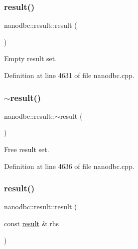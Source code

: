 \subsubsection{\texorpdfstring{result()}{result()}\hspace{0.1cm}{\footnotesize\ttfamily [1/3]}}
{\footnotesize\ttfamily nanodbc\+::result\+::result (\begin{DoxyParamCaption}{ }\end{DoxyParamCaption})}



Empty result set. 



Definition at line 4631 of file nanodbc.\+cpp.

\mbox{\label{classnanodbc_1_1result_a19f6d7665824d9b06d7c2db22b34b4f3}} 
\subsubsection{\texorpdfstring{$\sim$result()}{~result()}}
{\footnotesize\ttfamily nanodbc\+::result\+::$\sim$result (\begin{DoxyParamCaption}{ }\end{DoxyParamCaption})\hspace{0.3cm}{\ttfamily [noexcept]}}



Free result set. 



Definition at line 4636 of file nanodbc.\+cpp.

\mbox{\label{classnanodbc_1_1result_a47f04c9526ecd6a1abf503ac534edc23}} 
\subsubsection{\texorpdfstring{result()}{result()}\hspace{0.1cm}{\footnotesize\ttfamily [2/3]}}
{\footnotesize\ttfamily nanodbc\+::result\+::result (\begin{DoxyParamCaption}\item[{const \mbox{\hyperlink{classnanodbc_1_1result}{result}} \&}]{rhs }\end{DoxyParamCaption})}




